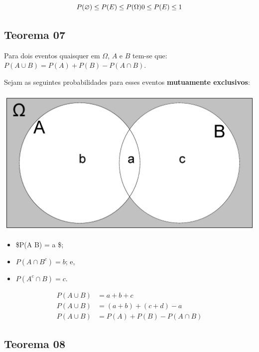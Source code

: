 \documentclass[
]{book}
\providecommand{\tightlist}{%
  \setlength{\itemsep}{0pt}\setlength{\parskip}{0pt}}
\begin{document}
\hfill\break

\[
P(\varnothing)  \le P(E) \le P(\Omega) \\
0 \le P(E) \le 1
\]

\hfill\break

\hypertarget{teorema-07}{%
\subsection{Teorema 07}\label{teorema-07}}

Para dois eventos quaisquer em \(\Omega\), \(A\) e \(B\) tem-se que: \(P( A \cup B ) = P(A) + P(B) - P(A \cap B)\).

\hfill\break

Sejam as seguintes probabilidades para esses eventos \textbf{mutuamente exclusivos}:

\hfill\break

\begin{center}\includegraphics[width=0.5\linewidth]{images4/venn_TEO_7} \end{center}

\hfill\break

\begin{itemize}
\tightlist
\item
  \$P(A \cap B) = a \$;\\
\item
  \(P(A \cap B^{c}) = b\); e,\\
\item
  \(P(A^{c} \cap B) = c\).
\end{itemize}

\hfill\break

\begin{align*}
P ( A \cup B) & = a + b + c \\
P ( A \cup B) & = (a + b) + (c + d) - a \\
P ( A \cup B) & = P(A) + P(B) - P(A \cap B)
\end{align*}

\hfill\break

\hypertarget{teorema-08}{%
\subsection{Teorema 08}\label{teorema-08}}
\end{document}
